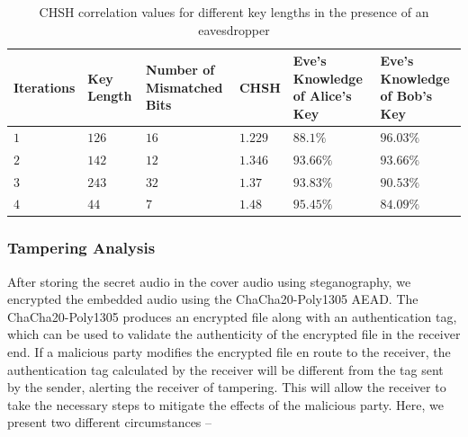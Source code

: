 \documentclass[a4paper]{cas-sc}
\begin{document}
\begin{table}[pos=h]
    \begin{center}
        \caption{CHSH correlation values for different key lengths in the presence of an eavesdropper}
        \begin{tabularx}{\textwidth}{>{\centering\arraybackslash}X>{\centering\arraybackslash}X>{\centering\arraybackslash}X>{\centering\arraybackslash}X>{\centering\arraybackslash}X>{\centering\arraybackslash}X}
            \hline
            Iterations & Key Length & Number of Mismatched Bits & CHSH    & Eve's Knowledge of Alice's Key & Eve's Knowledge of Bob's Key \\ \hline
            $1$        & $126$      & $16$                      & $1.229$ & $88.1\%$                       & $96.03\%$                    \\
            $2$        & $142$      & $12$                      & $1.346$ & $93.66\%$                      & $93.66\%$                    \\
            $3$        & $243$      & $32$                      & $1.37$  & $93.83\%$                      & $90.53\%$                    \\
            $4$        & $44$       & $7$                       & $1.48$  & $95.45\%$                      & $84.09\%$                    \\
            \hline
        \end{tabularx}
        \label{table:chshEveKnowledge}
    \end{center}
\end{table}
\subsubsection{Tampering Analysis}
After storing the secret audio in the cover audio using steganography, we encrypted the embedded audio using the ChaCha20-Poly1305 AEAD. The ChaCha20-Poly1305 produces an encrypted file along with an authentication tag, which can be used to validate the authenticity of the encrypted file in the receiver end. If a malicious party modifies the encrypted file en route to the receiver, the authentication tag calculated by the receiver will be different from the tag sent by the sender, alerting the receiver of tampering. This will allow the receiver to take the necessary steps to mitigate the effects of the malicious party. Here, we present two different circumstances --
\end{document}
